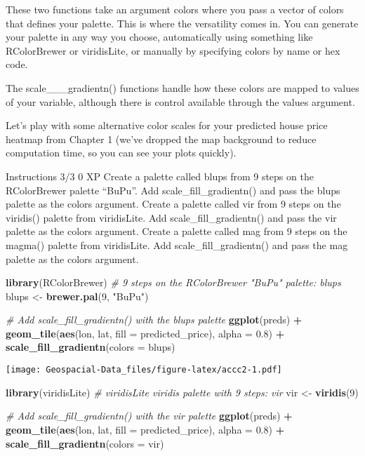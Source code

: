 \documentclass[]{article}
\newenvironment{Shaded}{\begin{snugshade}}{\end{snugshade}}
\newcommand{\CommentTok}[1]{\textcolor[rgb]{0.56,0.35,0.01}{\textit{#1}}}
\newcommand{\DataTypeTok}[1]{\textcolor[rgb]{0.13,0.29,0.53}{#1}}
\newcommand{\DecValTok}[1]{\textcolor[rgb]{0.00,0.00,0.81}{#1}}
\newcommand{\FloatTok}[1]{\textcolor[rgb]{0.00,0.00,0.81}{#1}}
\newcommand{\KeywordTok}[1]{\textcolor[rgb]{0.13,0.29,0.53}{\textbf{#1}}}
\newcommand{\NormalTok}[1]{#1}
\newcommand{\OperatorTok}[1]{\textcolor[rgb]{0.81,0.36,0.00}{\textbf{#1}}}
\newcommand{\StringTok}[1]{\textcolor[rgb]{0.31,0.60,0.02}{#1}}
\begin{document}
These two functions take an argument colors where you pass a vector of
colors that defines your palette. This is where the versatility comes
in. You can generate your palette in any way you choose, automatically
using something like RColorBrewer or viridisLite, or manually by
specifying colors by name or hex code.

The scale\_\_\_gradientn() functions handle how these colors are mapped
to values of your variable, although there is control available through
the values argument.

Let's play with some alternative color scales for your predicted house
price heatmap from Chapter 1 (we've dropped the map background to reduce
computation time, so you can see your plots quickly).

Instructions 3/3 0 XP Create a palette called blups from 9 steps on the
RColorBrewer palette ``BuPu''. Add scale\_fill\_gradientn() and pass the
blups palette as the colors argument. Create a palette called vir from 9
steps on the viridis() palette from viridisLite. Add
scale\_fill\_gradientn() and pass the vir palette as the colors
argument. Create a palette called mag from 9 steps on the magma()
palette from viridisLite. Add scale\_fill\_gradientn() and pass the mag
palette as the colors argument.

\begin{Shaded}
\begin{Highlighting}[]
\KeywordTok{library}\NormalTok{(RColorBrewer)}
\CommentTok{# 9 steps on the RColorBrewer "BuPu" palette: blups}
\NormalTok{blups <-}\StringTok{ }\KeywordTok{brewer.pal}\NormalTok{(}\DecValTok{9}\NormalTok{, }\StringTok{"BuPu"}\NormalTok{)}

\CommentTok{# Add scale_fill_gradientn() with the blups palette}
\KeywordTok{ggplot}\NormalTok{(preds) }\OperatorTok{+}
\StringTok{  }\KeywordTok{geom_tile}\NormalTok{(}\KeywordTok{aes}\NormalTok{(lon, lat, }\DataTypeTok{fill =}\NormalTok{ predicted_price), }\DataTypeTok{alpha =} \FloatTok{0.8}\NormalTok{) }\OperatorTok{+}
\StringTok{  }\KeywordTok{scale_fill_gradientn}\NormalTok{(}\DataTypeTok{colors =}\NormalTok{ blups)}
\end{Highlighting}
\end{Shaded}

\texttt{[image: Geospacial-Data\_files/figure-latex/accc2-1.pdf]}

\begin{Shaded}
\begin{Highlighting}[]
\KeywordTok{library}\NormalTok{(viridisLite)}
\CommentTok{# viridisLite viridis palette with 9 steps: vir}
\NormalTok{vir <-}\StringTok{ }\KeywordTok{viridis}\NormalTok{(}\DecValTok{9}\NormalTok{)}

\CommentTok{# Add scale_fill_gradientn() with the vir palette}
\KeywordTok{ggplot}\NormalTok{(preds) }\OperatorTok{+}
\StringTok{  }\KeywordTok{geom_tile}\NormalTok{(}\KeywordTok{aes}\NormalTok{(lon, lat, }\DataTypeTok{fill =}\NormalTok{ predicted_price), }\DataTypeTok{alpha =} \FloatTok{0.8}\NormalTok{) }\OperatorTok{+}
\StringTok{  }\KeywordTok{scale_fill_gradientn}\NormalTok{(}\DataTypeTok{colors =}\NormalTok{ vir)}
\end{Highlighting}
\end{Shaded}
\end{document}
